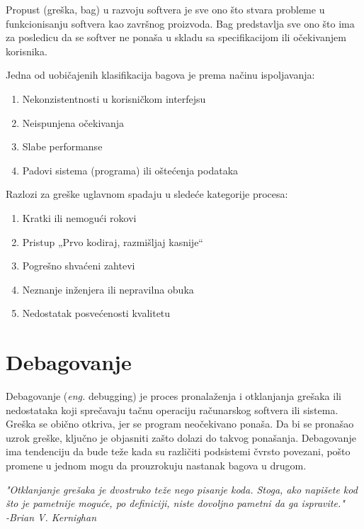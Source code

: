 \documentclass[a4paper]{article}
\begin{document}
Propust (greška, bag) u razvoju softvera je sve ono što stvara probleme u funkcionisanju softvera 
kao završnog proizvoda. Bag predstavlja sve ono što ima za posledicu da se softver ne ponaša u 
skladu sa specifikacijom ili očekivanjem korisnika\cite{deb_app}. 

\vspace{4mm}

Jedna od uobičajenih klasifikacija bagova je prema načinu ispoljavanja\cite{deb_app}:
\begin{enumerate}
\item Nekonzistentnosti u korisničkom interfejsu
\item Neispunjena očekivanja
\item Slabe performanse
\item Padovi sistema (programa) ili oštećenja podataka
\end{enumerate}

\vspace{4mm}

Razlozi za greške uglavnom spadaju u sledeće kategorije procesa\cite{deb_app}:
\begin{enumerate}
\item Kratki ili nemogući rokovi
\item Pristup „Prvo kodiraj, razmišljaj kasnije“
\item Pogrešno shvaćeni zahtevi
\item Neznanje inženjera ili nepravilna obuka
\item Nedostatak posvećenosti kvalitetu
\end{enumerate}


\section{Debagovanje}	
\label{sec:debagovanje}

Debagovanje (\textit{eng.} debugging) je proces pronalaženja i otklanjanja grešaka ili 
nedostataka koji sprečavaju tačnu operaciju računarskog softvera ili sistema. Greška se 
obično otkriva, jer se program neočekivano ponaša. Da bi se pronašao uzrok greške, 
ključno je objasniti zašto dolazi do takvog ponašanja. Debagovanje ima tendenciju da 
bude teže kada su različiti podsistemi čvrsto povezani, pošto promene u jednom mogu da 
prouzrokuju nastanak bagova u drugom\cite{debagovanje}.	

\vspace{4mm}

\textit{"Otklanjanje grešaka je dvostruko teže nego pisanje koda. Stoga, ako napišete kod što 
je pametnije moguće, po definiciji, niste dovoljno pametni da ga ispravite."\\
\hspace*{0pt}\hfill-Brian V. Kernighan}
\end{document}
